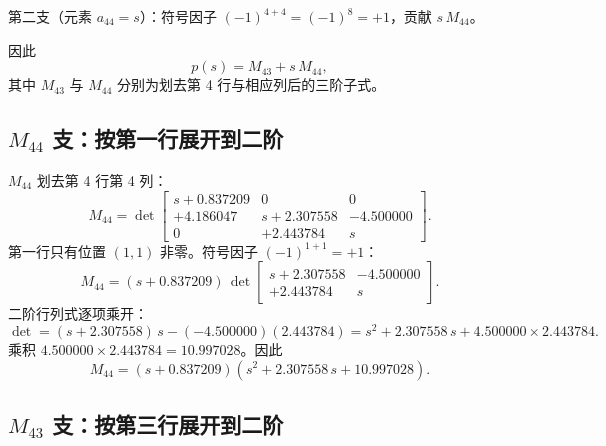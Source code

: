 \documentclass[11pt,a4paper]{ctexart}
\begin{document}
第二支（元素 $a_{44}=s$）：符号因子 $(-1)^{4+4}=(-1)^{8}=+1$，贡献 $s\,M_{44}$。

因此
\begin{equation}\label{eq:8-1}
p(s) = M_{43} + s\,M_{44},
\tag{(8-1)}
\end{equation}
其中 $M_{43}$ 与 $M_{44}$ 分别为划去第 4 行与相应列后的三阶子式。

\subsection{\texorpdfstring{$M_{44}$}{M44} 支：按第一行展开到二阶}

$M_{44}$ 划去第 4 行第 4 列：
\[
M_{44} = \det
\begin{bmatrix}
s+0.837209 & 0 & 0 \\
+4.186047 & s+2.307558 & -4.500000 \\
0 & +2.443784 & s
\end{bmatrix}.
\]
第一行只有位置 $(1,1)$ 非零。符号因子 $(-1)^{1+1}=+1$：
\[
M_{44} = (s+0.837209)\,
\det\begin{bmatrix} s+2.307558 & -4.500000 \\ +2.443784 & s \end{bmatrix}.
\]
二阶行列式逐项乘开：
\[
\det = (s+2.307558)\,s - (-4.500000)(2.443784)
= s^2 + 2.307558\,s + 4.500000\times 2.443784.
\]
乘积 $4.500000\times 2.443784 = 10.997028$。因此
\begin{equation}\label{eq:8-2}
M_{44} = (s+0.837209)\left(s^2 + 2.307558\,s + 10.997028\right).
\tag{(8-2)}
\end{equation}

\subsection{\texorpdfstring{$M_{43}$}{M43} 支：按第三行展开到二阶}
\end{document}
